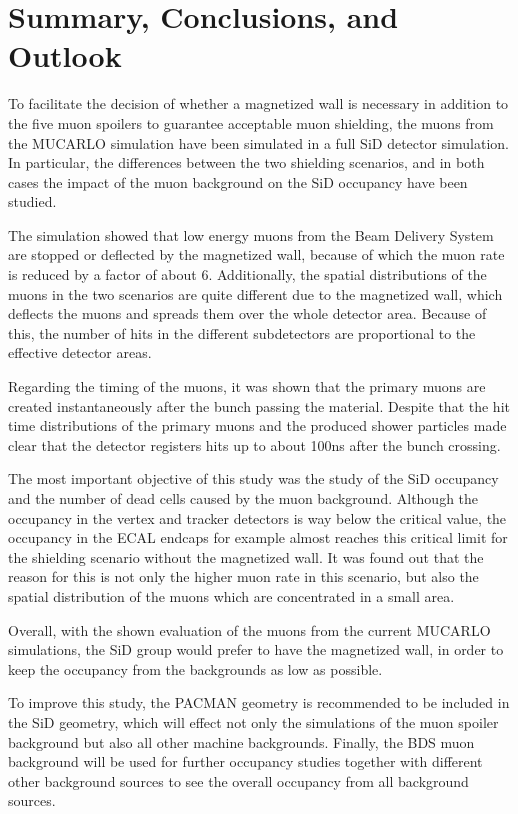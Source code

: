 \section{Summary, Conclusions, and Outlook}

To facilitate the decision of whether a magnetized wall is necessary in addition to the five muon spoilers to guarantee acceptable muon shielding, the muons from the MUCARLO simulation have been simulated in a full SiD detector simulation.
In particular, the differences between the two shielding scenarios, and in both cases the impact of the muon background on the SiD occupancy have been studied.

The simulation showed that low energy muons from the Beam Delivery System are stopped or deflected by the magnetized wall, because of which the muon rate is reduced by a factor of about 6.
Additionally, the spatial distributions of the muons in the two scenarios are quite different due to the magnetized wall, which deflects the muons and spreads them over the whole detector area.
Because of this, the number of hits in the different subdetectors are proportional to the effective detector areas.

Regarding the timing of the muons, it was shown that the primary muons are created instantaneously after the bunch passing the material.
Despite that the hit time distributions of the primary muons and the produced shower particles made clear that the detector registers hits up to about \unit{100}{ns} after the bunch crossing.

The most important objective of this study was the study of the SiD occupancy and the number of dead cells caused by the muon background.
Although the occupancy in the vertex and tracker detectors is way below the critical value, the occupancy in the ECAL endcaps for example almost reaches this critical limit for the shielding scenario without the magnetized wall.
It was found out that the reason for this is not only the higher muon rate in this scenario, but also the spatial distribution of the muons which are concentrated in a small area.

Overall, with the shown evaluation of the muons from the current MUCARLO simulations, the SiD group would prefer to have the magnetized wall, in order to keep the occupancy from the backgrounds as low as possible.

To improve this study, the PACMAN geometry is recommended to be included in the SiD geometry, which will effect not only the simulations of the muon spoiler background but also all other machine backgrounds.
Finally, the BDS muon background will be used for further occupancy studies together with different other background sources to see the overall occupancy from all background sources.

